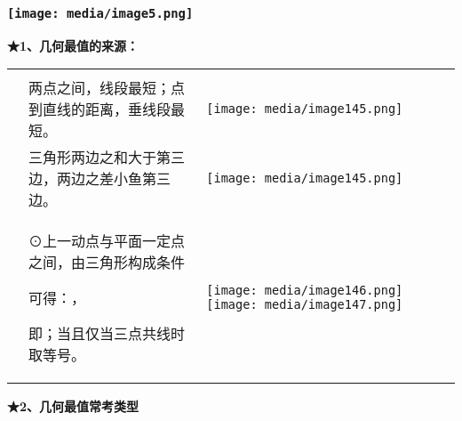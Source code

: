 \documentclass[a4paper,11pt,UTF8]{ctexart}
\begin{document}
\hypertarget{ux5b66ux79d1ux7f51www.zxxk.com--ux6559ux80b2ux8d44ux6e90ux95e8ux6237ux63d0ux4f9bux8bd5ux9898ux8bd5ux5377ux6559ux6848ux8bfeux4ef6ux6559ux5b66ux8bbaux6587ux7d20ux6750ux7b49ux5404ux7c7bux6559ux5b66ux8d44ux6e90ux5e93ux4e0bux8f7dux8fd8ux6709ux5927ux91cfux4e30ux5bccux7684ux6559ux5b66ux8d44ux8baf-27}{%
\subsubsection{\texorpdfstring{\protect\texttt{[image: media/image5.png]}}{学科网(www.zxxk.com)-\/-教育资源门户，提供试题试卷、教案、课件、教学论文、素材等各类教学资源库下载，还有大量丰富的教学资讯！}}\label{ux5b66ux79d1ux7f51www.zxxk.com--ux6559ux80b2ux8d44ux6e90ux95e8ux6237ux63d0ux4f9bux8bd5ux9898ux8bd5ux5377ux6559ux6848ux8bfeux4ef6ux6559ux5b66ux8bbaux6587ux7d20ux6750ux7b49ux5404ux7c7bux6559ux5b66ux8d44ux6e90ux5e93ux4e0bux8f7dux8fd8ux6709ux5927ux91cfux4e30ux5bccux7684ux6559ux5b66ux8d44ux8baf-27}}

\textbf{★1、几何最值的来源：}

\begin{longtable}[]{@{}lll@{}}
\toprule
\endhead
& &\tabularnewline
& 两点之间，线段最短；点到直线的距离，垂线段最短。 &
\texttt{[image: media/image145.png]}\tabularnewline
& 三角形两边之和大于第三边，两边之差小鱼第三边。 &
\texttt{[image: media/image145.png]}\tabularnewline
\begin{minipage}[t]{0.30\columnwidth}\raggedright
\strut
\end{minipage} & \begin{minipage}[t]{0.30\columnwidth}\raggedright
⊙上一动点与平面一定点之间，由三角形构成条件

可得：，

即；当且仅当三点共线时取等号。\strut
\end{minipage} & \begin{minipage}[t]{0.30\columnwidth}\raggedright
\texttt{[image: media/image146.png]}\texttt{[image: media/image147.png]}\strut
\end{minipage}\tabularnewline
\bottomrule
\end{longtable}

\textbf{★2、几何最值常考类型}
\end{document}
